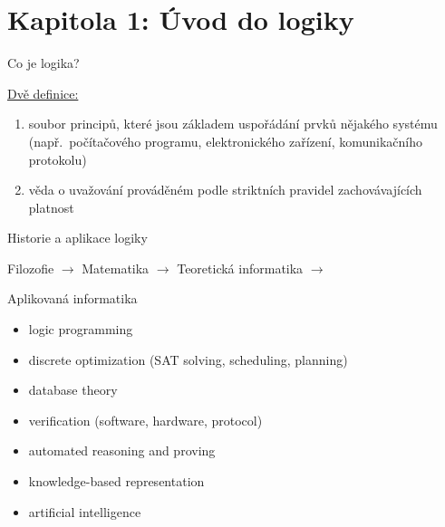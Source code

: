 \documentclass{beamer}
\begin{document}
\section{\sc Kapitola 1: Úvod do logiky}


\begin{frame}{Co je logika?}

    
    \begin{block}{\href{https://www.google.com/search?q=define+logic}{Dvě definice:}}
        \begin{enumerate}
            \item soubor principů, které jsou základem uspořádání prvků nějakého systému (např.\ počítačového programu, elektronického zařízení, komunikačního protokolu)
            \item věda o uvažování prováděném podle striktních pravidel zachovávajících platnost 
        \end{enumerate}        
    \end{block}


\end{frame}


\begin{frame}{Historie a aplikace logiky}

    {\footnotesize Filozofie $\to$}  {\normalsize Matematika $\to$}  {\large Teoretická informatika $\to$} 
        
    {\Large Aplikovaná informatika}

    \begin{itemize}
        \item logic programming
        \item discrete optimization (SAT solving, scheduling, planning)
        \item database theory
        \item verification (software, hardware, protocol)
        \item automated reasoning and proving
        \item knowledge-based representation
        \item artificial intelligence
    \end{itemize}

\end{frame}
\end{document}
